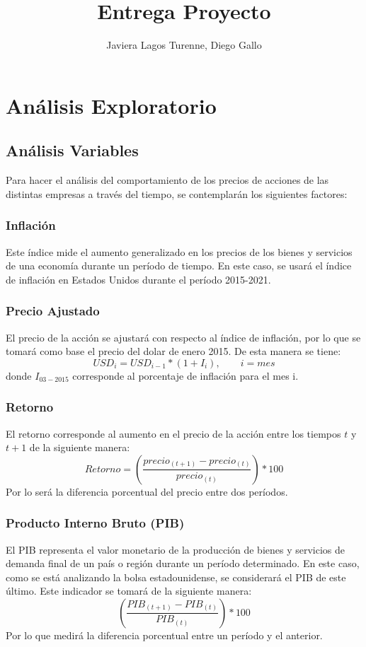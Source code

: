 \documentclass{article}
\title{Entrega Proyecto}
\author{Javiera Lagos Turenne, Diego Gallo}
\date{}
\begin{document}
\maketitle
\tableofcontents
\section{Análisis Exploratorio}
\subsection{Análisis Variables}
Para hacer el análisis del comportamiento de los precios de acciones de las distintas empresas a través del tiempo, se contemplarán los siguientes factores: 
\subsubsection{Inflación} Este índice mide el aumento generalizado en los precios de los bienes y servicios de una economía durante un período de tiempo. En este caso, se usará el índice de inflación en Estados Unidos durante el período 2015-2021.
\subsubsection{Precio Ajustado} El precio de la acción se ajustará con respecto al índice de inflación, por lo que se tomará como base el precio del dolar de enero 2015. De esta manera se tiene: 
\[
USD_{i} = USD_{i-1}*(1+I_{i}), \qquad i=mes
\]
donde $I_{03-2015}$ corresponde al porcentaje de inflación para el mes i.
\subsubsection{Retorno} El retorno corresponde al aumento en el precio de la acción entre los tiempos $t$ y $t+1$ de la siguiente manera: 
\[
Retorno = \left(\frac{precio_{(t+1)}-precio_{(t)}}{precio_{(t)}}\right)*100
\]
Por lo será la diferencia porcentual del precio entre dos períodos.
\subsubsection{Producto Interno Bruto (PIB)} El PIB representa el valor monetario de la producción de bienes y servicios de demanda final de un país o región durante un período determinado. En este caso, como se está analizando la bolsa estadounidense, se considerará el PIB de este último. Este indicador se tomará de la siguiente manera:
\[
\left(\frac{PIB_{(t+1)}-PIB_{(t)}}{PIB_{(t)}}\right)*100
\]
Por lo que medirá la diferencia porcentual entre un período y el anterior. 
\end{document}

